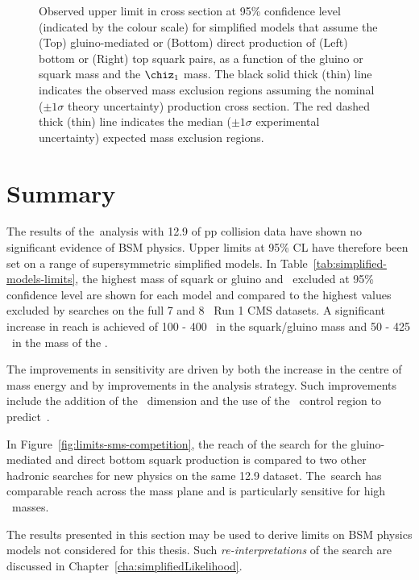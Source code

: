\begin{figure}[thp!]
\begin{center}
    \caption{Observed upper limit in cross section at 95\% confidence
      level (indicated by the colour scale) for simplified models that
      assume the (Top) gluino-mediated or (Bottom) direct production
      of (Left) bottom or (Right) top squark pairs, as a function of
      the gluino or squark mass and the $\chiz_{1}$ 
      mass. The black solid thick (thin) line indicates the observed
      mass exclusion regions assuming the nominal (${\pm}1 \sigma$
      theory uncertainty) production cross section. The red dashed
      thick (thin) line indicates the median (${\pm}1 \sigma$
      experimental uncertainty) expected mass exclusion
      regions. 
      \label{fig:limits-sms} }
  \end{center}
\end{figure}

\section{Summary}

The results of the~\alphat analysis with 12.9 \ifb of pp collision data have shown no significant
evidence of BSM physics. Upper limits at 95\% CL have therefore been set on a range 
of supersymmetric simplified models. In Table~\ref{tab:simplified-models-limits}, the highest mass 
of squark or gluino and \chiz~excluded at 95\% confidence level are shown for each model and compared to the highest
values excluded by searches on the full 7 and 8 \TeV~Run 1 CMS datasets. 
A significant increase in reach is achieved of 100 - 400 \GeV~in the
squark/gluino mass and 50 - 425 \GeV~in the mass of the \chiz. 

The improvements in sensitivity are driven by both the increase in the 
centre of mass energy and by improvements in the analysis strategy. Such improvements
include the addition of the \mht~dimension and the use of the \mj~control region
to predict~\zInv.

In Figure~\ref{fig:limits-sms-competition},
the reach of the \alphat search for the gluino-mediated and direct bottom
squark production is compared to two other hadronic searches for new physics on the 
same 12.9 \ifb dataset. The~\alphat search has comparable reach across the mass
plane and is particularly sensitive for high \chiz~masses.

The results presented in this section may be used to derive limits on BSM physics models 
not considered for this thesis. Such \emph{re-interpretations} of the \alphat search 
are discussed in Chapter~\ref{cha:simplifiedLikelihood}.

